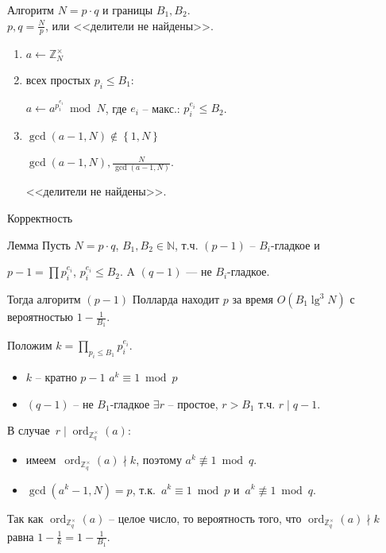 \documentclass{beamer}
\begin{document}
\begin{frame}{Алгоритм}
 $N = p \cdot q$ и границы $B_1, B_2$.\\
 $p,q = \frac{N}{p}$, или <<делители не найдены>>.
    \begin{enumerate}
        \item $
        a\mathop  \leftarrow \mathbb{Z}_N^\times$
        \item {} всех простых ${p_i} \leqslant {B_1}$:
        
        \quad $a \leftarrow a^{p_i^{e_i}}\bmod N$, где $e_i$ -- макс.: $p_i^{e_i} \leqslant {B_2}$.
        
        \item {} $\gcd (a-1, N) \not  \in \left\{ {1,N} \right\}$
        
        \quad {} $\gcd (a-1, N), \frac{N}{\gcd (a-1, N)}$. 
        
        
        \quad {} <<делители не найдены>>.
    \end{enumerate}
\end{frame}

\begin{frame}{Корректность}
\begin{block}{Лемма}
    Пусть $N = p \cdot q$, $B_1,B_2 \in \mathbb{N}$, т.ч. $(p- 1)$ -- $B_i$-гладкое и 
    
    $p - 1 = \prod p_i^{e_i}$, $p_i^{e_i} \leqslant B_2$. A $(q-1)$ — не $B_i$-гладкое. 
    
    Тогда алгоритм $(p-1)$ Полларда находит $p$ за время $O( B_1 \lg^3 N)$ с вероятностью $1  - \frac{1}{B_1}$.
\end{block}
\vspace{1em}

\ProofBegin
Положим $k = \prod\limits_{p_i \leq  B_1}{p_i^{e_i}}$.
\begin{itemize}
	\item $k$ -- кратно $p-1$ \MyImplies $a^k \equiv 1 \bmod{p}$
	\item $(q-1)$ -- не $B_1$-гладкое \MyImplies $\exists r$ -- простое, $r > B_1$ т.ч. $r \mid q-1$.
\end{itemize}
В случае~$r \mid \operatorname{ord}_{\mathbb{Z}_q^\times}(a)$:
\begin{itemize}
	\item имеем~$\operatorname{ord}_{\mathbb{Z}_q^\times}(a) \nmid k$,
	поэтому $a^k \not\equiv 1 \bmod{q}$.
	\item $\gcd(a^k - 1, N) = p$, т.к.~$a^k \equiv 1 \bmod{p}$ и~$a^k \not\equiv 1 \bmod{q}$.
\end{itemize}
	

Так как $\operatorname{ord}_{\mathbb{Z}_q^\times}(a)$ -- целое число, то вероятность того, что $\operatorname{ord}_{\mathbb{Z}_q^\times}(a) \nmid k$ равна $1 -\frac{1}{k} = 1 - \frac{1}{B_1}$. 
\ProofEnd
\end{frame}
\end{document}
